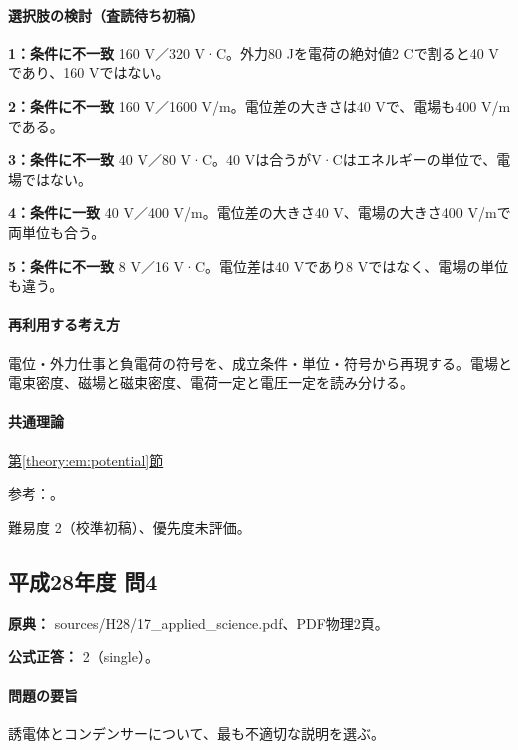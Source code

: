 \paragraph{選択肢の検討（査読待ち初稿）}\mbox{}\par

\noindent\textbf{1：条件に不一致} 160 V／320 V·C。外力80 Jを電荷の絶対値2 Cで割ると40 Vであり、160 Vではない。\par

\noindent\textbf{2：条件に不一致} 160 V／1600 V/m。電位差の大きさは40 Vで、電場も400 V/mである。\par

\noindent\textbf{3：条件に不一致} 40 V／80 V·C。40 Vは合うがV·Cはエネルギーの単位で、電場ではない。\par

\noindent\textbf{4：条件に一致} 40 V／400 V/m。電位差の大きさ40 V、電場の大きさ400 V/mで両単位も合う。\par

\noindent\textbf{5：条件に不一致} 8 V／16 V·C。電位差は40 Vであり8 Vではなく、電場の単位も違う。\par

\paragraph{再利用する考え方} 電位・外力仕事と負電荷の符号を、成立条件・単位・符号から再現する。電場と電束密度、磁場と磁束密度、電荷一定と電圧一定を読み分ける。

\paragraph{共通理論} \hyperref[theory:em:potential]{第\ref*{theory:em:potential}節}

\par 参考：\cite{mit_em03}。

\par 難易度 2（校準初稿）、優先度未評価。

\subsection{平成28年度 問4}
\label{q:h28-reg-applied-04}

\noindent\textbf{原典：} sources/H28/17\_applied\_science.pdf、PDF物理2頁。

\textbf{公式正答：} 2（single）。

\paragraph{問題の要旨} 誘電体とコンデンサーについて、最も不適切な説明を選ぶ。

